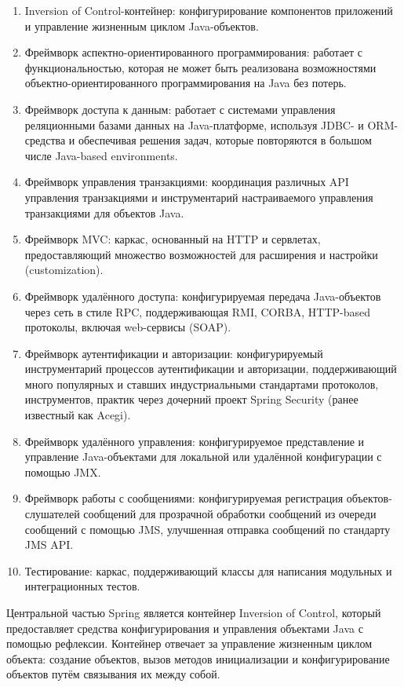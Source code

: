\begin{enumerate}
	\item Inversion of Control-контейнер: конфигурирование компонентов приложений и управление жизненным циклом Java-объектов.
	\item Фреймворк аспектно-ориентированного программирования: работает с функциональностью, которая не может быть реализована возможностями объектно-ориентированного программирования на Java без потерь.
	\item Фреймворк доступа к данным: работает с системами управления реляционными базами данных на Java-платформе, используя JDBC- и ORM-средства и обеспечивая решения задач, которые повторяются в большом числе Java-based environments.
	\item Фреймворк управления транзакциями: координация различных API управления транзакциями и инструментарий настраиваемого управления транзакциями для объектов Java.
	\item Фреймворк MVC: каркас, основанный на HTTP и сервлетах, предоставляющий множество возможностей для расширения и настройки (customization).
	\item Фреймворк удалённого доступа: конфигурируемая передача Java-объектов через сеть в стиле RPC, поддерживающая RMI, CORBA, HTTP-based протоколы, включая web-сервисы (SOAP).
	\item Фреймворк аутентификации и авторизации: конфигурируемый инструментарий процессов аутентификации и авторизации, поддерживающий много популярных и ставших индустриальными стандартами протоколов, инструментов, практик через дочерний проект Spring Security (ранее известный как Acegi).
	\item Фреймворк удалённого управления: конфигурируемое представление и управление Java-объектами для локальной или удалённой конфигурации с помощью JMX.
	\item Фреймворк работы с сообщениями: конфигурируемая регистрация объектов-слушателей сообщений для прозрачной обработки сообщений из очереди сообщений с помощью JMS, улучшенная отправка сообщений по стандарту JMS API.
	\item Тестирование: каркас, поддерживающий классы для написания модульных и интеграционных тестов.
\end{enumerate}

Центральной частью Spring является контейнер Inversion of Control, который предоставляет средства конфигурирования и управления объектами Java с помощью рефлексии. Контейнер отвечает за управление жизненным циклом объекта: создание объектов, вызов методов инициализации и конфигурирование объектов путём связывания их между собой.

